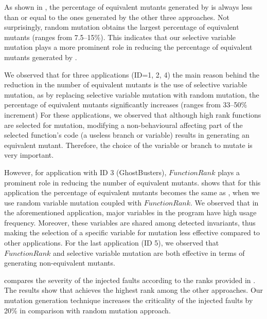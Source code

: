 As shown in , the percentage of equivalent mutants generated by \mutandis is always less than or equal to the ones generated by the other three approaches. 
Not surprisingly, random mutation obtains the largest percentage of equivalent mutants (ranges from 7.5--15\%). 
This indicates that our selective variable mutation plays a more prominent role in reducing the percentage of equivalent mutants generated by \mutandis.




We observed that for three applications (ID=1, 2, 4) the main reason behind the reduction in the number of equivalent mutants is the use of selective variable mutation, 
as by replacing selective variable mutation with random mutation,
the percentage of equivalent mutants significantly increases (ranges from 33--50\% increment)
For these applications, we observed that although high rank functions are selected for mutation, modifying a non-behavioural affecting part of the selected function's code (\ie a useless branch or variable) results in generating an equivalent mutant. Therefore, the choice of the variable or branch to mutate is very important.

However, for application with ID 3 (GhostBusters), $FunctionRank$ plays a prominent role in reducing the number of equivalent mutants.
 shows that for this application the percentage of equivalent mutants becomes the same as \mutandis, when we use random variable mutation coupled with $FunctionRank$. 
We observed that in the aforementioned application,
major variables in the program have high usage frequency. Moreover, these variables are shared among detected invariants, thus making the selection of a specific variable for mutation less
effective compared to other applications. For the last application (ID 5), we observed that $FunctionRank$ and selective variable mutation are both effective in terms of generating
non-equivalent mutants.

 compares the severity of the injected faults according to the ranks provided in . The results show that \mutandis achieves the highest rank among the other approaches. Our mutation generation technique increases the criticality of the injected faults by 20\% in comparison with random mutation approach. 
%


